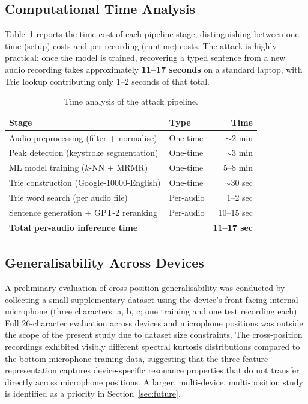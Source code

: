 \documentclass[conference]{IEEEtran}
\begin{document}
\subsection{Computational Time Analysis}

Table~\ref{tab:timing} reports the time cost of each pipeline stage, distinguishing between one-time (setup) costs and per-recording (runtime) costs. The attack is highly practical: once the model is trained, recovering a typed sentence from a new audio recording takes approximately \textbf{11--17 seconds} on a standard laptop, with Trie lookup contributing only 1--2 seconds of that total.

\begin{table}[h]
\centering
\caption{Time analysis of the attack pipeline.}
\label{tab:timing}
\renewcommand{\arraystretch}{1.2}
\begin{tabular}{llr}
\toprule
\textbf{Stage} & \textbf{Type} & \textbf{Time} \\
\midrule
Audio preprocessing (filter + normalise)  & One-time  & $\sim$2 min \\
Peak detection (keystroke segmentation)   & One-time  & $\sim$3 min \\
ML model training ($k$-NN + MRMR)         & One-time  & 5--8 min \\
Trie construction (Google-10000-English)  & One-time  & $\sim$30 sec \\
\midrule
Trie word search (per audio file)         & Per-audio & 1--2 sec \\
Sentence generation + GPT-2 reranking     & Per-audio & 10--15 sec \\
\midrule
\textbf{Total per-audio inference time}   &           & \textbf{11--17 sec} \\
\bottomrule
\end{tabular}
\end{table}


\subsection{Generalisability Across Devices}

A preliminary evaluation of cross-position generalisability was
conducted by collecting a small supplementary dataset using the
device's front-facing internal microphone (three characters: a, b,
c; one training and one test recording each).
Full 26-character evaluation across devices and microphone positions
was outside the scope of the present study due to dataset size
constraints.
The cross-position recordings exhibited visibly different spectral
kurtosis distributions compared to the bottom-microphone training
data, suggesting that the three-feature representation captures
device-specific resonance properties that do not transfer directly
across microphone positions.
A larger, multi-device, multi-position study is identified as a
priority in Section~\ref{sec:future}.
\end{document}
